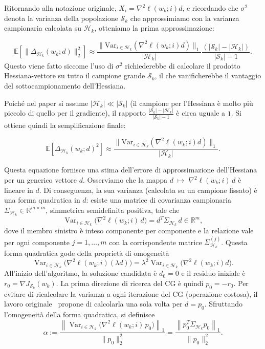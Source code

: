 \documentclass[a4paper,12pt]{article}
\numberwithin{equation}{section}
\numberwithin{figure}{section}
\numberwithin{table}{section}
\begin{document}
Ritornando alla notazione originale, \(X_i = \nabla^2 \ell(w_k;i)d\), e ricordando che $\sigma^2$ denota la varianza della popolazione $\mathcal{S}_k$ che approssimiamo con la varianza campionaria calcolata su \(\mathcal{H}_k\), otteniamo la prima approssimazione:

\[
\mathbb{E}[\|\Delta_{\mathcal{H}_k}(w_k; d)\|_2^2]
\approx \frac{\| \mathrm{Var}_{i \in \mathcal{H}_k}\left(\nabla^2 \ell(w_k; i) d\right) \|_1}{|\mathcal{H}_k|}
\frac{(|\mathcal{S}_k| - |\mathcal{H}_k|)}{|\mathcal{S}_k| - 1}. \tag{5.35a}\label{eq:5_35a}
\]
Questo viene fatto siccome l'uso di \(\sigma^2\) richiederebbe di calcolare il prodotto Hessiana-vettore su tutto il campione grande \(\mathcal{S}_k\), il che vanificherebbe il vantaggio del sottocampionamento dell'Hessiana.

Poiché nel paper si assume \(|\mathcal{H}_k| \ll |\mathcal{S}_k|\) (il campione per l'Hessiana è molto più piccolo di quello per il gradiente), il rapporto \(\frac{|\mathcal{S}_k|-|\mathcal{H}_k|}{|\mathcal{S}_k|-1}\) è circa uguale a \(1\). Si ottiene quindi la semplificazione finale:

\[
\mathbb{E}[\Delta_{\mathcal{H}_k}(w_k; d)^2]
\approx \frac{\| \mathrm{Var}_{i \in \mathcal{H}_k}\left(\nabla^2 \ell(w_k; i) d\right) \|_1}{|\mathcal{H}_k|}. \tag{5.35b}\label{eq:5_35b}
\]

Questa equazione fornisce una stima dell'errore di approssimazione dell'Hessiana per un generico vettore $d$.
Osserviamo che la mappa 
$d \;\longmapsto\; \nabla^2\ell(w_k;i)\,d$
è lineare in $d$. Di conseguenza, la sua varianza (calcolata su un campione fissato) è una forma quadratica in $d$: esiste una matrice di covarianza campionaria $\Sigma_{\mathcal{H}_k} \in \mathbb{R}^{m\times m}$, simmetrica semidefinita positiva, tale che
\[
\operatorname{Var}_{i\in\mathcal{H}_k}\bigl(\nabla^2\ell(w_k;i)\,d\bigr)
= d^T \Sigma_{\mathcal{H}_k}\, d \in \mathbb{R}^m,
\]
dove il membro sinistro è inteso componente per componente e la relazione vale per ogni componente $j=1,\dots,m$ con la corrispondente matrice $\Sigma_{\mathcal{H}_k}^{(j)}$. Questa forma quadratica gode della proprietà di omogeneità
\[
\operatorname{Var}_{i\in\mathcal{H}_k}\bigl(\nabla^2\ell(w_k;i)(\lambda d)\bigr)
= \lambda^2 \operatorname{Var}_{i\in\mathcal{H}_k}\bigl(\nabla^2\ell(w_k;i)d\bigr).
\]
\medskip
\noindent
All'inizio dell'algoritmo, la soluzione candidata è $d_0 = 0$ e il residuo iniziale è $r_0 = \nabla J_{\mathcal{S}_k}(w_k)$. La prima direzione di ricerca del CG è quindi $p_0 = -r_0$. 
Per evitare di ricalcolare la varianza a ogni iterazione del CG (operazione costosa), il lavoro originale~\cite{byrd2012} propone di calcolarla una sola volta per $d = p_0$. Sfruttando l'omogeneità della forma quadratica, si definisce
\[
\alpha := \frac{\left\| \operatorname{Var}_{i\in\mathcal{H}_k}\bigl(\nabla^2\ell(w_k;i)\,p_0\bigr) \right\|_1}{\|p_0\|_2^2}
= \frac{\left\| p_0^T \Sigma_{\mathcal{H}_k} p_0 \right\|_1}{\|p_0\|_2^2}.
\tag{5.36}\label{eq:5_36}
\]
\end{document}
